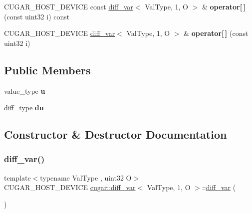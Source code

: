 \begin{DoxyCompactItemize}
C\+U\+G\+A\+R\+\_\+\+H\+O\+S\+T\+\_\+\+D\+E\+V\+I\+CE const \hyperlink{structcugar_1_1diff__var}{diff\+\_\+var}$<$ Val\+Type, 1, O $>$ \& {\bfseries operator\mbox{[}$\,$\mbox{]}} (const uint32 i) const
\item 
\mbox{\label{structcugar_1_1diff__var_3_01_val_type_00_011_00_01_o_01_4_a9b6f476e557ee658a455d430256e4534}} 
C\+U\+G\+A\+R\+\_\+\+H\+O\+S\+T\+\_\+\+D\+E\+V\+I\+CE \hyperlink{structcugar_1_1diff__var}{diff\+\_\+var}$<$ Val\+Type, 1, O $>$ \& {\bfseries operator\mbox{[}$\,$\mbox{]}} (const uint32 i)
\end{DoxyCompactItemize}
\subsection*{Public Members}
\begin{DoxyCompactItemize}
\item 
\mbox{\label{structcugar_1_1diff__var_3_01_val_type_00_011_00_01_o_01_4_a2f6aae29d1ea39c944705b2059428c8c}} 
value\+\_\+type {\bfseries u}
\item 
\mbox{\label{structcugar_1_1diff__var_3_01_val_type_00_011_00_01_o_01_4_a483198585eb53fd2500ed9f56df42caf}} 
\hyperlink{structcugar_1_1diff__var}{diff\+\_\+type} {\bfseries du}
\end{DoxyCompactItemize}


\subsection{Constructor \& Destructor Documentation}
\mbox{\label{structcugar_1_1diff__var_3_01_val_type_00_011_00_01_o_01_4_a799727aaab5d85e36951155b4ab8515b}} 
\subsubsection{\texorpdfstring{diff\+\_\+var()}{diff\_var()}\hspace{0.1cm}{\footnotesize\ttfamily [1/5]}}
{\footnotesize\ttfamily template$<$typename Val\+Type , uint32 O$>$ \\
C\+U\+G\+A\+R\+\_\+\+H\+O\+S\+T\+\_\+\+D\+E\+V\+I\+CE \hyperlink{structcugar_1_1diff__var}{cugar\+::diff\+\_\+var}$<$ Val\+Type, 1, O $>$\+::\hyperlink{structcugar_1_1diff__var}{diff\+\_\+var} (\begin{DoxyParamCaption}{ }\end{DoxyParamCaption})\hspace{0.3cm}{\ttfamily [inline]}}

